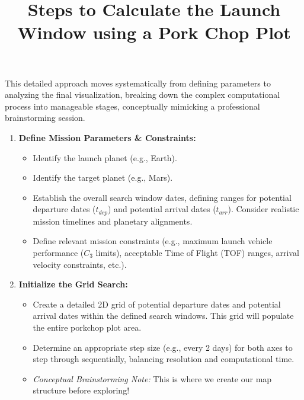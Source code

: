 \documentclass[12pt]{article}
\title{\textbf{Steps to Calculate the Launch Window using a Pork Chop Plot}}
\author{}
\date{}
\begin{document}
\maketitle

This detailed approach moves systematically from defining parameters to analyzing the final visualization, breaking down the complex computational process into manageable stages, conceptually mimicking a professional brainstorming session.

\begin{enumerate}
    \item \textbf{Define Mission Parameters \& Constraints:}
    \begin{itemize}
        \item Identify the launch planet (e.g., Earth).
        \item Identify the target planet (e.g., Mars).
        \item Establish the overall search window dates, defining ranges for potential departure dates ($t_{dep}$) and potential arrival dates ($t_{arr}$). Consider realistic mission timelines and planetary alignments.
        \item Define relevant mission constraints (e.g., maximum launch vehicle performance ($C_3$ limits), acceptable Time of Flight (TOF) ranges, arrival velocity constraints, etc.).
    \end{itemize}

    \item \textbf{Initialize the Grid Search:}
    \begin{itemize}
        \item Create a detailed 2D grid of potential departure dates and potential arrival dates within the defined search windows. This grid will populate the entire porkchop plot area.
        \item Determine an appropriate step size (e.g., every 2 days) for both axes to step through sequentially, balancing resolution and computational time.
        \item \textit{Conceptual Brainstorming Note:} This is where we create our map structure before exploring!
    \end{itemize}


\end{enumerate}
\end{document}
